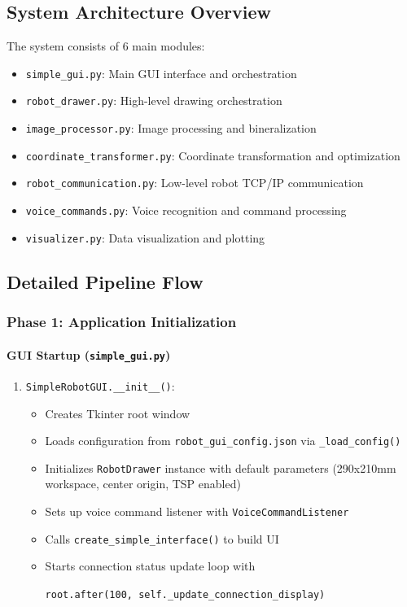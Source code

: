 \documentclass[a4paper,12pt]{article}
\begin{document}
\subsection{System Architecture Overview}

The system consists of 6 main modules:
\begin{itemize}
\item \texttt{simple\_gui.py}: Main GUI interface and orchestration
\item \texttt{robot\_drawer.py}: High-level drawing orchestration
\item \texttt{image\_processor.py}: Image processing and bineralization
\item \texttt{coordinate\_transformer.py}: Coordinate transformation and optimization
\item \texttt{robot\_communication.py}: Low-level robot TCP/IP communication
\item \texttt{voice\_commands.py}: Voice recognition and command processing
\item \texttt{visualizer.py}: Data visualization and plotting
\end{itemize}

\subsection{Detailed Pipeline Flow}

\subsubsection{Phase 1: Application Initialization}

\paragraph{GUI Startup (\texttt{simple\_gui.py})}
\begin{enumerate}
\item \texttt{SimpleRobotGUI.\_\_init\_\_()}:
	\begin{itemize}
	\item Creates Tkinter root window
	\item Loads configuration from \texttt{robot\_gui\_config.json} via \texttt{\_load\_config()}
	\item Initializes \texttt{RobotDrawer} instance with default parameters (290x210mm workspace, center origin, TSP enabled)
	\item Sets up voice command listener with \texttt{VoiceCommandListener}
	\item Calls \texttt{create\_simple\_interface()} to build UI
	\item Starts connection status update loop with 
    
    \texttt{root.after(100, self.\_update\_connection\_display)}
	\end{itemize}
\end{enumerate}
\end{document}
